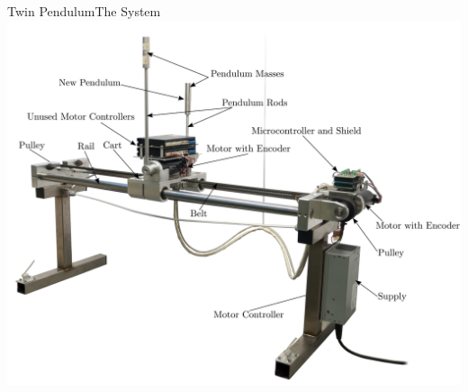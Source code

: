 
\begin{frame}{Twin Pendulum}{The System}
  \vspace{-.5cm}\hspace{1cm}
  \includegraphics[width=.8\textwidth]{figures/twinSetupLabled}
\end{frame}


